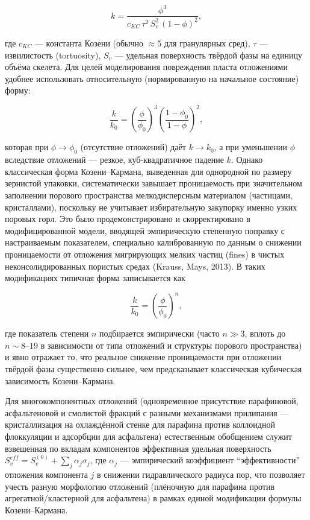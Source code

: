 \documentclass[11pt]{extarticle}
\begin{document}
\[
k = \frac{\phi^3}{c_{KC}\, \tau^2\, S_v^2\,(1-\phi)^2},
\]

где \(c_{KC}\) --- константа Козени (обычно \(\approx 5\) для гранулярных сред), \(\tau\) --- извилистость (tortuosity), \(S_v\) --- удельная поверхность твёрдой фазы на единицу объёма скелета. Для целей моделирования повреждения пласта отложениями удобнее использовать относительную (нормированную на начальное состояние) форму:

\[
\frac{k}{k_0} = \left(\frac{\phi}{\phi_0}\right)^{3} \left(\frac{1-\phi_0}{1-\phi}\right)^{2},
\]

которая при \(\phi \to \phi_0\) (отсутствие отложений) даёт \(k\to k_0\), а при уменьшении \(\phi\) вследствие отложений --- резкое, куб-квадратичное падение \(k\). Однако классическая форма Козени--Кармана, выведенная для однородной по размеру зернистой упаковки, систематически завышает проницаемость при значительном заполнении порового пространства мелкодисперсным материалом (частицами, кристаллами), поскольку не учитывает избирательную закупорку именно узких поровых горл. Это было продемонстрировано и скорректировано в модифицированной модели, вводящей эмпирическую степенную поправку с настраиваемым показателем, специально калиброванную по данным о снижении проницаемости от отложения мигрирующих мелких частиц (fines) в чистых неконсолидированных пористых средах (Krauss, Mays, 2013). В таких модификациях типичная форма записывается как

\[
\frac{k}{k_0} = \left(\frac{\phi}{\phi_0}\right)^{n},
\]

где показатель степени \(n\) подбирается эмпирически (часто \(n \gg 3\), вплоть до \(n\sim 8\)--\(19\) в зависимости от типа отложений и структуры порового пространства) и явно отражает то, что реальное снижение проницаемости при отложении твёрдой фазы существенно сильнее, чем предсказывает классическая кубическая зависимость Козени--Кармана.

Для многокомпонентных отложений (одновременное присутствие парафиновой, асфальтеновой и смолистой фракций с разными механизмами прилипания --- кристаллизация на охлаждённой стенке для парафина против коллоидной флоккуляции и адсорбции для асфальтена) естественным обобщением служит взвешенная по вкладам компонентов эффективная удельная поверхность \(S_v^{eff} = S_v^{(0)} + \sum_j \alpha_j \sigma_j\), где \(\alpha_j\) --- эмпирический коэффициент ``эффективности'' отложения компонента \(j\) в снижении гидравлического радиуса пор, что позволяет учесть разную морфологию отложений (плёночную для парафина против агрегатной/кластерной для асфальтена) в рамках единой модификации формулы Козени--Кармана.
\end{document}
